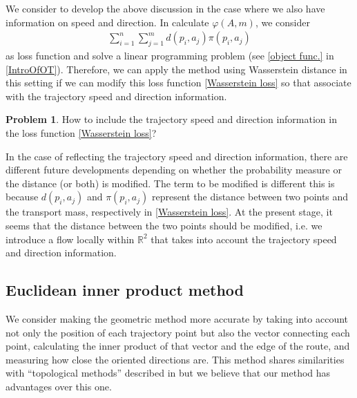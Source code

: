 \documentclass{article}
\numberwithin{equation}{section}
\theoremstyle{definition}
\newtheorem{prob}[prob]{Problem}
\newcommand{\R}{\mathbb{R}}
\begin{document}
We consider to develop the above discussion in the case where we also have information on speed and direction.
In calculate $\varphi(A,m)$, we consider 
\begin{align}
    \sum_{i=1}^n \sum_{j=1}^m d(p_i,a_j)\pi(p_i,a_j) \label{Wasserstein loss}
\end{align}
as loss function and solve a linear programming problem (see \eqref{object func.} in \autoref{IntroOfOT}).
Therefore, we can apply the method using Wasserstein distance in this setting if we can modify this loss function \eqref{Wasserstein loss} so that associate with the trajectory speed and direction information.

\begin{prob}
How to include the trajectory speed and direction information in the loss function \eqref{Wasserstein loss}?
\end{prob}

In the case of reflecting the trajectory speed and direction information, there are different future developments depending on whether the probability measure or the distance (or both) is modified.
The term to be modified is different this is because $d(p_i,a_j)$ and $\pi(p_i,a_j)$ represent the distance between two points and the transport mass, respectively in \eqref{Wasserstein loss}.
At the present stage, it seems that the distance between the two points should be modified, i.e. we introduce a flow locally within $\R^2$ that takes into account the trajectory speed and direction information.


\subsection{Euclidean inner product method}

We consider making the geometric method more accurate by taking into account not only the position of each trajectory point but also the vector connecting each point, calculating the inner product of that vector and the edge of the route, and measuring how close the oriented directions are. This method shares similarities with ``topological methods'' described in \cite{QOZN} but we believe that our method has advantages over this one.
\end{document}
